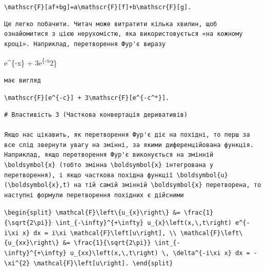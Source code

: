 \documentclass[
  ukrainian,
]{article}
\begin{document}
\texttt{\textbackslash{}mathscr\{F\}{[}af+bg{]}=a\textbackslash{}mathscr\{F\}{[}f{]}+b\textbackslash{}mathscr\{F\}{[}g{]}.}

\begin{verbatim}
Це легко побачити. Читач може витратити кілька хвилин, щоб ознайомитися з цією нерухомістю, яка використовується «на кожному кроці». Наприклад, перетворення Фур'є виразу
\end{verbatim}

e\^{}\{-x\} + 3e\textsuperscript{\{-x}2\}

\begin{verbatim}
має вигляд
\end{verbatim}

\texttt{\textbackslash{}mathscr\{F\}{[}e\^{}\{-c\}{]}\ +\ 3\textbackslash{}mathscr\{F\}{[}e\^{}\{-c\^{}*\}{]}.}

\begin{verbatim}
# Властивість 3 (Часткова конвертація деривативів)

Якщо нас цікавить, як перетворення Фур'є діє на похідні, то перш за все слід звернути увагу на змінні, за якими диференційована функція. Наприклад, якщо перетворення Фур'є виконується на змінній \boldsymbol{x} (тобто змінна \boldsymbol{x} інтегрована у перетворення), і якщо часткова похідна функції \boldsymbol{u}(\boldsymbol{x},t) на тій самій змінній \boldsymbol{x} перетворена, то наступні формули перетворення похідних є дійсними
\end{verbatim}

\texttt{\textbackslash{}begin\{split\}\ \textbackslash{}mathcal\{F\}\textbackslash{}left\textbackslash{}\{u\_\{x\}\textbackslash{}right\textbackslash{}\}\ \&=\ \textbackslash{}frac\{1\}\{\textbackslash{}sqrt\{2\textbackslash{}pi\}\}\ \textbackslash{}int\_\{-\textbackslash{}infty\}\^{}\{+\textbackslash{}infty\}\ u\_\{x\}\textbackslash{}left(x,\textbackslash{},t\textbackslash{}right)\ e\^{}\{-i\textbackslash{}xi\ x\}\ dx\ =\ i\textbackslash{}xi\ \textbackslash{}mathcal\{F\}\textbackslash{}left{[}u\textbackslash{}right{]},\ \textbackslash{}\textbackslash{}\ \textbackslash{}mathcal\{F\}\textbackslash{}left\textbackslash{}\{u\_\{xx\}\textbackslash{}right\textbackslash{}\}\ \&=\ \textbackslash{}frac\{1\}\{\textbackslash{}sqrt\{2\textbackslash{}pi\}\}\ \textbackslash{}int\_\{-\textbackslash{}infty\}\^{}\{+\textbackslash{}infty\}\ u\_\{xx\}\textbackslash{}left(x,\textbackslash{},t\textbackslash{}right)\ \textbackslash{},\ \textbackslash{}delta\^{}\{-i\textbackslash{}xi\ x\}\ dx\ =\ -\textbackslash{}xi\^{}\{2\}\ \textbackslash{}mathcal\{F\}\textbackslash{}left{[}u\textbackslash{}right{]}.\ \textbackslash{}end\{split\}}
\end{document}
